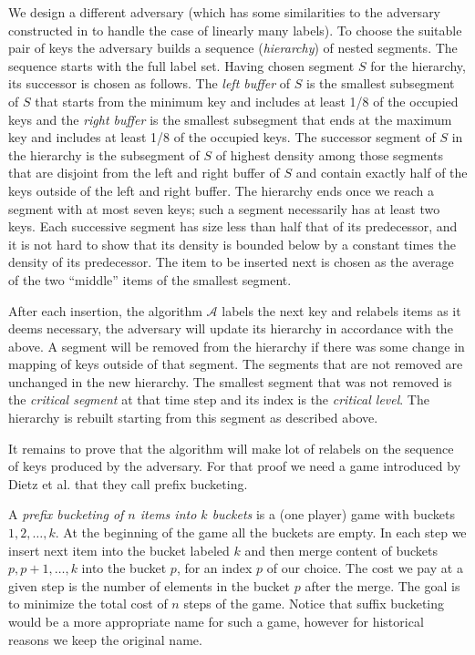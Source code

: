 \documentclass[runningheads,a4paper]{llncs}
\newcommand{\A}{\mathcal{A}}
\begin{document}
We design a different adversary (which has some similarities to the adversary constructed in \cite{BKS} to handle
the case of linearly many labels).
To choose the suitable pair of keys the adversary builds a sequence (\emph{hierarchy}) of nested segments. The sequence
starts with the full label set.  Having chosen segment $S$ for the hierarchy, its successor is chosen as follows.
The {\em left buffer} of $S$
is the smallest subsegment of $S$ that starts from the minimum key and
includes at least 1/8 of the occupied keys and the {\em right buffer} is the smallest subsegment that ends at the maximum key
and includes at least 1/8 of the occupied keys.  The successor segment of $S$ in the hierarchy is
the subsegment of $S$
of highest density among those segments that are disjoint from the left and right buffer of $S$ and contain exactly
half of the keys outside of the left and right buffer.
The hierarchy ends once we reach a segment with at most seven keys; such a segment necessarily has at least two keys.
Each successive segment has size less than half that of its predecessor, and it is not hard to show that 
its density is bounded below by a constant times the density of its predecessor.
The item to be inserted next is chosen as the average of the two ``middle'' items of the smallest segment.

After each insertion,
the algorithm $\A$ labels the next key and relabels items as it deems necessary, the adversary will update its
hierarchy in accordance with the above.  A segment will be removed from the hierarchy if there was some change in mapping of keys outside of that segment.
The segments that are not removed are unchanged in the new hierarchy.
The smallest segment that was not removed is the \emph{critical segment} at that time step and its index is the \emph{critical level}.
The hierarchy is  rebuilt starting from this segment as described above.

It remains to prove that the algorithm will make lot of relabels on the sequence
of keys produced by the adversary. 
For that proof we need a game introduced by Dietz et al. \cite{DSZ04} that they
call prefix bucketing.

A \emph{prefix bucketing of $n$ items into $k$ buckets} is a (one player) game with buckets $1,2,\dots,k$. At the beginning of the game
all the buckets are empty. In each step we insert next item into the bucket labeled $k$ and then merge
content of buckets $p,p+1,\dots,k$ into the bucket $p$, for an index $p$ of our choice. The cost we pay at a given step
is the number of elements in the bucket $p$ after the merge. The goal is to minimize the total cost of $n$ steps 
of the game. 
Notice that suffix bucketing would be a more appropriate name for such a game, however for historical reasons we keep the original name.
\end{document}
